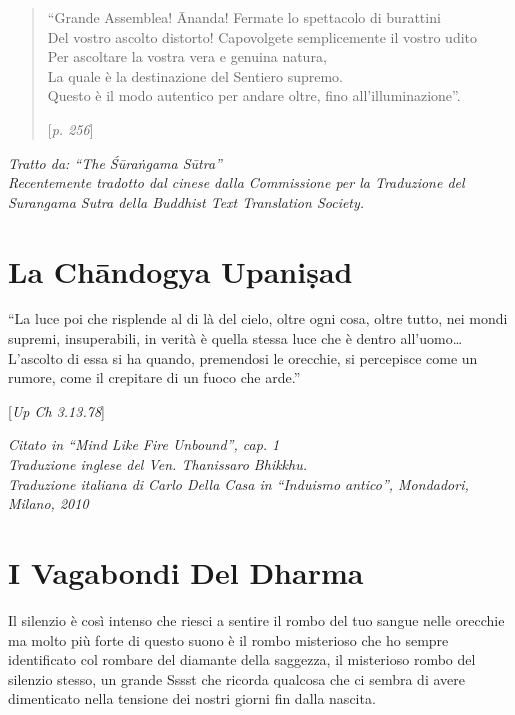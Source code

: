 \begin{quotation}
``Grande Assemblea! Ānanda! Fermate lo spettacolo di burattini\\
Del vostro ascolto distorto! Capovolgete semplicemente il vostro udito\\
Per ascoltare la vostra vera e genuina natura,\\
La quale è la destinazione del Sentiero supremo.\\
Questo è il modo autentico per andare oltre, fino all'illuminazione''.

[\emph{p. 256}]
\end{quotation}

\smallskip

{\small\itshape
  Tratto da: ``The Śūraṅgama Sūtra''\\
  Recentemente tradotto dal cinese dalla Commissione per la Traduzione del
  Surangama Sutra della Buddhist Text Translation Society.
}

\clearpage

\section*{La Chāndogya Upaniṣad}

``La luce poi che risplende al di là del cielo, oltre ogni cosa, oltre
tutto, nei mondi supremi, insuperabili, in verità è quella stessa luce
che è dentro all'uomo\ldots{} L'ascolto di essa si ha quando, premendosi
le orecchie, si percepisce come un rumore, come il crepitare di un fuoco
che arde.''

[\emph{Up Ch 3.13.78}]

{\small\itshape
  Citato in ``Mind Like Fire Unbound'', cap. 1\\
  Traduzione inglese del Ven. Thanissaro Bhikkhu.\\
  Traduzione italiana di Carlo Della Casa in ``Induismo antico'', Mondadori,
  Milano, 2010
}

\section*{I Vagabondi Del Dharma}

Il silenzio è così intenso che riesci a sentire il rombo del tuo sangue
nelle orecchie ma molto più forte di questo suono è il rombo misterioso
che ho sempre identificato col rombare del diamante della saggezza, il
misterioso rombo del silenzio stesso, un grande Sssst che ricorda
qualcosa che ci sembra di avere dimenticato nella tensione dei nostri
giorni fin dalla nascita.

